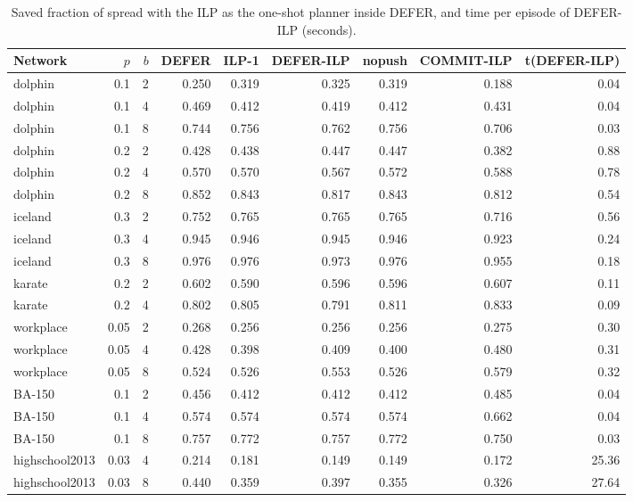 \documentclass[11pt]{article}
\theoremstyle{definition}
\theoremstyle{remark}
\begin{document}
\begin{table}[h]
\centering
\caption{Saved fraction of spread with the ILP as the one-shot planner inside DEFER,
and time per episode of DEFER-ILP (seconds).\label{tab:defer-ilp}}
\footnotesize
\begin{tabular}{lrrrrrrrr}
\hline
Network & $p$ & $b$ & DEFER & ILP-1 & DEFER-ILP & nopush & COMMIT-ILP & t(DEFER-ILP)\\
\hline
dolphin & 0.1 & 2 & 0.250 & 0.319 & 0.325 & 0.319 & 0.188 & 0.04 \\
dolphin & 0.1 & 4 & 0.469 & 0.412 & 0.419 & 0.412 & 0.431 & 0.04 \\
dolphin & 0.1 & 8 & 0.744 & 0.756 & 0.762 & 0.756 & 0.706 & 0.03 \\
dolphin & 0.2 & 2 & 0.428 & 0.438 & 0.447 & 0.447 & 0.382 & 0.88 \\
dolphin & 0.2 & 4 & 0.570 & 0.570 & 0.567 & 0.572 & 0.588 & 0.78 \\
dolphin & 0.2 & 8 & 0.852 & 0.843 & 0.817 & 0.843 & 0.812 & 0.54 \\
iceland & 0.3 & 2 & 0.752 & 0.765 & 0.765 & 0.765 & 0.716 & 0.56 \\
iceland & 0.3 & 4 & 0.945 & 0.946 & 0.945 & 0.946 & 0.923 & 0.24 \\
iceland & 0.3 & 8 & 0.976 & 0.976 & 0.973 & 0.976 & 0.955 & 0.18 \\
karate & 0.2 & 2 & 0.602 & 0.590 & 0.596 & 0.596 & 0.607 & 0.11 \\
karate & 0.2 & 4 & 0.802 & 0.805 & 0.791 & 0.811 & 0.833 & 0.09 \\
workplace & 0.05 & 2 & 0.268 & 0.256 & 0.256 & 0.256 & 0.275 & 0.30 \\
workplace & 0.05 & 4 & 0.428 & 0.398 & 0.409 & 0.400 & 0.480 & 0.31 \\
workplace & 0.05 & 8 & 0.524 & 0.526 & 0.553 & 0.526 & 0.579 & 0.32 \\
BA-150 & 0.1 & 2 & 0.456 & 0.412 & 0.412 & 0.412 & 0.485 & 0.04 \\
BA-150 & 0.1 & 4 & 0.574 & 0.574 & 0.574 & 0.574 & 0.662 & 0.04 \\
BA-150 & 0.1 & 8 & 0.757 & 0.772 & 0.757 & 0.772 & 0.750 & 0.03 \\
highschool2013 & 0.03 & 4 & 0.214 & 0.181 & 0.149 & 0.149 & 0.172 & 25.36 \\
highschool2013 & 0.03 & 8 & 0.440 & 0.359 & 0.397 & 0.355 & 0.326 & 27.64 \\
\hline
\end{tabular}
\end{table}
\end{document}
